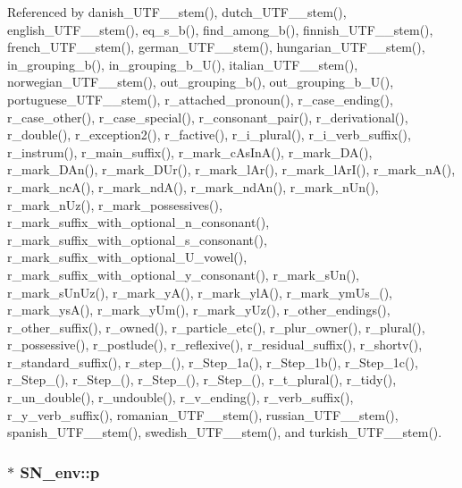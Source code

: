 Referenced by danish\_\-UTF\_\_\-stem(), dutch\_\-UTF\_\_\-stem(), english\_\-UTF\_\_\-stem(), eq\_\-s\_\-b(), find\_\-among\_\-b(), finnish\_\-UTF\_\_\-stem(), french\_\-UTF\_\_\-stem(), german\_\-UTF\_\_\-stem(), hungarian\_\-UTF\_\_\-stem(), in\_\-grouping\_\-b(), in\_\-grouping\_\-b\_\-U(), italian\_\-UTF\_\_\-stem(), norwegian\_\-UTF\_\_\-stem(), out\_\-grouping\_\-b(), out\_\-grouping\_\-b\_\-U(), portuguese\_\-UTF\_\_\-stem(), r\_\-attached\_\-pronoun(), r\_\-case\_\-ending(), r\_\-case\_\-other(), r\_\-case\_\-special(), r\_\-consonant\_\-pair(), r\_\-derivational(), r\_\-double(), r\_\-exception2(), r\_\-factive(), r\_\-i\_\-plural(), r\_\-i\_\-verb\_\-suffix(), r\_\-instrum(), r\_\-main\_\-suffix(), r\_\-mark\_\-cAsInA(), r\_\-mark\_\-DA(), r\_\-mark\_\-DAn(), r\_\-mark\_\-DUr(), r\_\-mark\_\-lAr(), r\_\-mark\_\-lArI(), r\_\-mark\_\-nA(), r\_\-mark\_\-ncA(), r\_\-mark\_\-ndA(), r\_\-mark\_\-ndAn(), r\_\-mark\_\-nUn(), r\_\-mark\_\-nUz(), r\_\-mark\_\-possessives(), r\_\-mark\_\-suffix\_\-with\_\-optional\_\-n\_\-consonant(), r\_\-mark\_\-suffix\_\-with\_\-optional\_\-s\_\-consonant(), r\_\-mark\_\-suffix\_\-with\_\-optional\_\-U\_\-vowel(), r\_\-mark\_\-suffix\_\-with\_\-optional\_\-y\_\-consonant(), r\_\-mark\_\-sUn(), r\_\-mark\_\-sUnUz(), r\_\-mark\_\-yA(), r\_\-mark\_\-ylA(), r\_\-mark\_\-ymUs\_\-(), r\_\-mark\_\-ysA(), r\_\-mark\_\-yUm(), r\_\-mark\_\-yUz(), r\_\-other\_\-endings(), r\_\-other\_\-suffix(), r\_\-owned(), r\_\-particle\_\-etc(), r\_\-plur\_\-owner(), r\_\-plural(), r\_\-possessive(), r\_\-postlude(), r\_\-reflexive(), r\_\-residual\_\-suffix(), r\_\-shortv(), r\_\-standard\_\-suffix(), r\_\-step\_(), r\_\-Step\_\-1a(), r\_\-Step\_\-1b(), r\_\-Step\_\-1c(), r\_\-Step\_(), r\_\-Step\_(), r\_\-Step\_(), r\_\-Step\_(), r\_\-t\_\-plural(), r\_\-tidy(), r\_\-un\_\-double(), r\_\-undouble(), r\_\-v\_\-ending(), r\_\-verb\_\-suffix(), r\_\-y\_\-verb\_\-suffix(), romanian\_\-UTF\_\_\-stem(), russian\_\-UTF\_\_\-stem(), spanish\_\-UTF\_\_\-stem(), swedish\_\-UTF\_\_\-stem(), and turkish\_\-UTF\_\_\-stem().\hypertarget{structSN__env_400280a08e61d3139b32bf9ac06eac59}{
\subsubsection[{p}]{$\ast$ {\bf SN\_\-env::p}}}
\label{structSN__env_400280a08e61d3139b32bf9ac06eac59}




